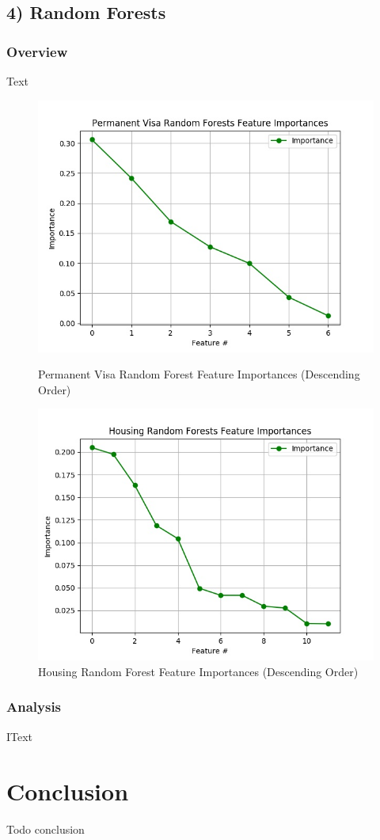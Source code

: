 \documentclass[h]{article}
\begin{document}
\subsection*{4) Random Forests}  
\subsubsection*{Overview}
Text

 \begin{figure}[H]
      \includegraphics[width=1\textwidth,keepaspectratio]{permanent_visa_random_forests_feature_importances.jpg} 
      \caption*{Permanent Visa Random Forest Feature Importances (Descending Order) } 
   \endminipage\hfill
      \includegraphics[width=1\textwidth,keepaspectratio]{housing_random_forests_feature_importances.jpg} 
      \caption*{Housing Random Forest Feature Importances (Descending Order)} 
   \endminipage\hfill
\end{figure}

\subsubsection*{Analysis}
IText


\section*{Conclusion}  
Todo conclusion
\end{document}
